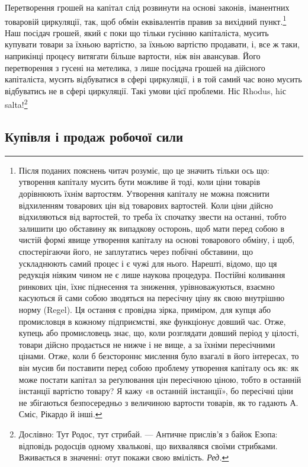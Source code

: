 Перетворення грошей на капітал слід розвинути на основі
законів, іманентних товаровій циркуляції, так, щоб обмін еквівалентів
правив за вихідний пункт.\footnote{
Після поданих пояснень читач розуміє, що це значить тільки ось
що: утворення капіталу мусить бути можливе й тоді, коли ціни товарів
дорівнюють їхнім вартостям. Утворення капіталу не можна пояснити відхиленням
товарових цін від товарових вартостей. Коли ціни дійсно
відхиляються від вартостей, то треба їх спочатку звести на останні, тобто
залишити цю обставину як випадкову осторонь, щоб мати перед собою в
чистій формі явище утворення капіталу на основі товарового обміну, і
щоб, спостерігаючи його, не заплутатись через побічні обставини, що
ускладнюють самий процес і є чужі для нього. Нарешті, відомо, що ця
редукція ніяким чином не є лише наукова процедура. Постійні коливання
ринкових цін, їхнє піднесення та зниження, урівноважуються,
взаємно
касуються й сами собою зводяться на пересічну ціну як свою внутрішню
норму (Regel). Ця остання є провідна зірка, приміром, для купця або
промисловця в кожному підприємстві, яке функціонує довший час. Отже,
купець або промисловець знає, що, коли розглядати довший період у
цілості, товари дійсно продається не нижче і не вище, а за їхніми пересічними
цінами. Отже, коли б безстороннє мислення було взагалі в його інтересах,
то він мусив би поставити перед собою проблему утворення капіталу
ось як: як може постати капітал за реґулювання цін пересічною ціною,
тобто в останній інстанції вартістю товару? Я кажу «в останній інстанції»,
бо пересічні ціни не збігаються безпосередньо з величиною вартости товарів,
як то гадають А. Сміс, Рікардо й інші.
} Наш посідач грошей, який
є поки що тільки гусінню капіталіста, мусить купувати товари
за їхньою вартістю, за їхньою вартістю продавати, і, все ж таки,
наприкінці процесу витягати більше вартости, ніж він авансував.
Його перетворення з гусені на метелика, з лише посідача
грошей на дійсного капіталіста, мусить відбуватися в сфері
циркуляції, і в той самий час воно мусить відбуватись не
в сфері циркуляції. Такі умови цієї проблеми. Ніс Rhodus,
hiс salta!\footnote*{
Дослівно: Тут Родос, тут стрибай. — Античне прислів’я з байок
Езопа: відповідь родосців одному хвалькові, що вихвалявся своїми
стрибками. Вживається в значенні: отут покажи свою вмілість. \emph{Ред.}
}

\subsection{Купівля і продаж робочої сили}

